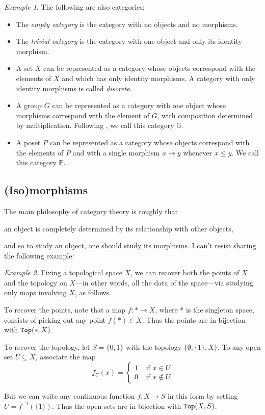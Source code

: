 \documentclass[11 pt]{amsart}
\theoremstyle{plain}   %
\theoremstyle{definition}
\theoremstyle{remark}
\newtheorem{ex}{Example}[section]
\numberwithin{equation}{section}
\def\GG{\mathbb{G}}
\def\PP{\mathbb{P}}
\newcommand{\cat}[1]{{\normalfont\texttt{#1}}}
\begin{document}
\begin{ex}\label{abstract categories} The following are also categories:
	\begin{itemize}
		\item The \emph{empty category} is the category with no objects and no
		      morphisms.
		\item The \emph{trivial category} is the category with one object and only
		      its identity morphism.
		\item A set $X$ can be represented as a category whose objects correspond
		      with the elements of $X$ and which has only identity morphisms. A category
		      with only identity morphisms is called \emph{discrete}.
		\item A group $G$ can be represented as a category with one object whose
		      morphisms correspond with the element of $G$, with composition
		      determined by multiplication. Following \cite{Porter}, we call this
		      category $\GG$.
		\item A poset $P$ can be represented as a category whose objects correspond
		      with the elements of $P$ and with a single morphism $x\rightarrow y$
		      whenever $x\leq y$. We call this category $\PP$.
	\end{itemize}
\end{ex}

\subsection{(Iso)morphisms}

The main philosophy of category theory is roughly that

\begin{displayquote}
	an object is completely determined by its relationship with other objects,
	\cite[p. 8]{Bradley}
\end{displayquote}

and so to study an object, one should study its morphisms. I can't resist
sharing the following example:

\begin{ex}\cite[Example 2.1.6(ii)]{Riehl}
	Fixing a topological space $X$, we can recover both the points of $X$ and the
	topology on $X$---in other words, all the data of the space---via studying
	only maps involving $X$, as follows.

	To recover the points, note that a map $f: *\rightarrow X$, where $*$ is the
	singleton space, consists of picking out any point $f(*)\in X$. Thus the
	points are in bijection with $\cat{Top}(*, X)$.

	To recover the topology, let $S = \{0, 1\}$ with the topology $\{\emptyset,
		\{1\}, X\}$. To any open set $U\subseteq X$, associate the map
	$$f_U(x) = \begin{cases}
			1 & \text{ if }x\in U    \\
			0 & \text{ if }x\notin U
		\end{cases}$$

	But we can write any continuous function $f: X\rightarrow S$ in this form by
	setting $U = f^{-1}(\{1\})$. Thus the open sets are in bijection with
	$\cat{Top}(X, S)$.
\end{ex}
\end{document}
